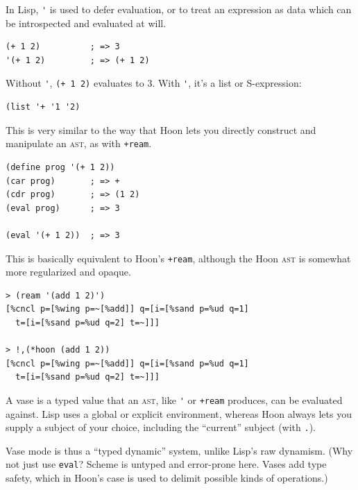 \documentclass[twoside]{article}
\begin{document}
In Lisp, \lstinline[style=inlinecode]{'} is used to defer evaluation, or to treat an expression as data which can be introspected and evaluated at will.

\begin{lstlisting}[style=listingcode_lisp]
(+ 1 2)          ; => 3
'(+ 1 2)         ; => (+ 1 2)
\end{lstlisting}

\noindent
Without \lstinline[style=inlinecode]{'}, \lstinline[style=inlinecode]{(+ 1 2)} evaluates to 3.  With \lstinline[style=inlinecode]{'}, it’s a list or S-expression:

\begin{lstlisting}[style=listingcode_lisp]
(list '+ '1 '2)
\end{lstlisting}

\noindent
This is very similar to the way that Hoon lets you directly construct and manipulate an \textsc{ast}, as with \lstinline[style=inlinecode]{+ream}.

\begin{lstlisting}[style=listingcode_lisp]
(define prog '(+ 1 2))
(car prog)       ; => +
(cdr prog)       ; => (1 2)
(eval prog)      ; => 3

(eval '(+ 1 2))  ; => 3
\end{lstlisting}

\noindent
This is basically equivalent to Hoon's \lstinline[style=inlinecode]{+ream}, although the Hoon \textsc{ast} is somewhat more regularized and opaque.

\begin{lstlisting}[style=listingcode]
> (ream '(add 1 2)')
[%cncl p=[%wing p=~[%add]] q=[i=[%sand p=%ud q=1]
  t=[i=[%sand p=%ud q=2] t=~]]]

> !,(*hoon (add 1 2))
[%cncl p=[%wing p=~[%add]] q=[i=[%sand p=%ud q=1]
  t=[i=[%sand p=%ud q=2] t=~]]]
\end{lstlisting}

A vase is a typed value that an \textsc{ast}, like \lstinline[style=inlinecode]{'} or \lstinline[style=inlinecode]{+ream} produces, can be evaluated against.   Lisp uses a global or explicit environment, whereas Hoon always lets you supply a subject of your choice, including the “current” subject (with \lstinline[style=inlinecode]{.}).

Vase mode is thus a “typed dynamic” system, unlike Lisp's raw dynamism.  (Why not just use \lstinline[style=inlinecode]{eval}?  Scheme is untyped and error-prone here.  Vases add type safety, which in Hoon's case is used to delimit possible kinds of operations.)
\end{document}
